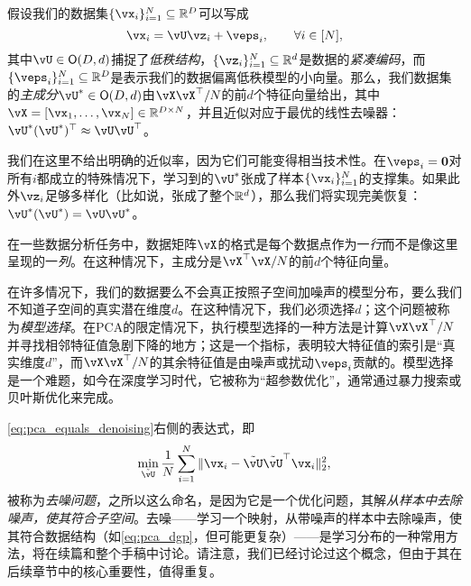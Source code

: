 \documentclass[../../book-main.tex]{subfiles}
\begin{document}
\begin{theorem}\label{thm:pca}
    假设我们的数据集\(\{\vx_{i}\}_{i = 1}^{N} \subseteq \R^{D}\)可以写成
    \begin{equation}
        \vx_{i} = \vU\vz_{i} + \veps_{i}, \qquad \forall i \in [N],
    \end{equation}
    其中\(\vU \in \O(D, d)\)捕捉了\textit{低秩结构}，\(\{\vz_{i}\}_{i = 1}^{N} \subseteq \R^{d}\)是数据的\textit{紧凑编码}，而\(\{\veps_{i}\}_{i = 1}^{N} \subseteq \R^{D}\)是表示我们的数据偏离低秩模型的小向量。那么，我们数据集的\textit{主成分}\(\vU^{\ast} \in \O(D, d)\)由\(\vX\vX^{\top}/N\)的前\(d\)个特征向量给出，其中\(\vX = [\vx_{1}, \dots, \vx_{N}] \in \R^{D \times N}\)，并且近似对应于最优的线性去噪器：\(\vU^{\ast}(\vU^{\ast})^{\top} \approx \vU\vU^{\top}\)。
\end{theorem}
我们在这里不给出明确的近似率，因为它们可能变得相当技术性。在\(\veps_{i} = \vzero\)对所有\(i\)都成立的特殊情况下，学习到的\(\vU^{\ast}\)张成了样本\(\{\vx_{i}\}_{i = 1}^{N}\)的支撑集。如果此外\(\vz_{i}\)足够多样化（比如说，张成了整个\(\mathbb{R}^{d}\)），那么我们将实现完美恢复：\(\vU^{\ast}(\vU^{\ast}) = \vU\vU^{\ast}\)。


\begin{remark}
    在一些数据分析任务中，数据矩阵\(\vX\)的格式是每个数据点作为一\textit{行}而不是像这里呈现的一\textit{列}。在这种情况下，主成分是\(\vX^{\top}\vX/N\)的前\(d\)个特征向量。
\end{remark}


\begin{remark}[通过去噪特征值进行基选择]
    在许多情况下，我们的数据要么不会真正按照子空间加噪声的模型分布，要么我们不知道子空间的真实潜在维度\(d\)。在这种情况下，我们必须选择\(d\)；这个问题被称为\textit{模型选择}。在PCA的限定情况下，执行模型选择的一种方法是计算\(\vX\vX^{\top}/N\)并寻找相邻特征值急剧下降的地方；这是一个指标，表明较大特征值的索引是“真实维度\(d\)”，而\(\vX\vX^{\top}/N\)的其余特征值是由噪声或扰动\(\veps_{i}\)贡献的。模型选择是一个难题，如今在深度学习时代，它被称为“超参数优化”，通常通过暴力搜索或贝叶斯优化来完成。%
\end{remark}

\begin{remark}[去噪样本]
    \eqref{eq:pca_equals_denoising}右侧的表达式，即
    \begin{equation}\label{eq:orthogonal_denoising}
        \min_{\tilde{\vU}}\frac{1}{N}\sum_{i = 1}^{N}\norm{\vx_{i} - \tilde{\vU}\tilde{\vU}^{\top}\vx_{i}}_{2}^{2},
    \end{equation}
    被称为\textit{去噪问题}，之所以这么命名，是因为它是一个优化问题，其解\textit{从样本中去除噪声，使其符合子空间}。去噪——学习一个映射，从带噪声的样本中去除噪声，使其符合数据结构（如\eqref{eq:pca_dgp}，但可能更复杂）——是学习分布的一种常用方法，将在续篇和整个手稿中讨论。请注意，我们已经讨论过这个概念，但由于其在后续章节中的核心重要性，值得重复。
\end{remark}
\end{document}
